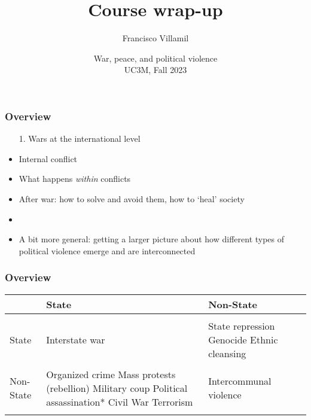 \documentclass[aspectratio=43]{beamer}
\title{\huge Course wrap-up}
\author{Francisco Villamil}
\date{War, peace, and political violence\\UC3M, Fall 2023}
\begin{document}
\begin{frame}
  \titlepage
\end{frame}

\begin{frame}
\frametitle{Overview}
\centering

\begin{itemize}
  \item[1.] Wars at the international level
  \item<2->[2.] Internal conflict
  \item<3->[3.] What happens \textit{within} conflicts
  \item<4->[4.] After war: how to solve and avoid them, how to `heal' society
  \item<5->[]
  \item<5->[$\rightarrow$] A bit more general: getting a larger picture about how different types of political violence emerge and are interconnected
\end{itemize}

\end{frame}

\begin{frame}
\frametitle{Overview}
\centering

\begin{tabular}{m{1.75cm}|m{4cm}m{4cm}}
& {\color{gray}{\footnotesize Target:}} \newline State & {\color{gray}{\footnotesize Target:}} \newline Non-State \\\hline\\
{\color{gray}{\footnotesize Perpetrator:}} \newline State & Interstate war & State repression \newline Genocide \newline Ethnic cleansing \\\\
{\color{gray}{\footnotesize Perpetrator:}} \newline Non-State & Organized crime \newline Mass protests (rebellion) \newline Military coup \newline Political assassination* \newline Civil War \newline Terrorism & Intercommunal violence\\\\\hline
\end{tabular}

\end{frame}
\end{document}

